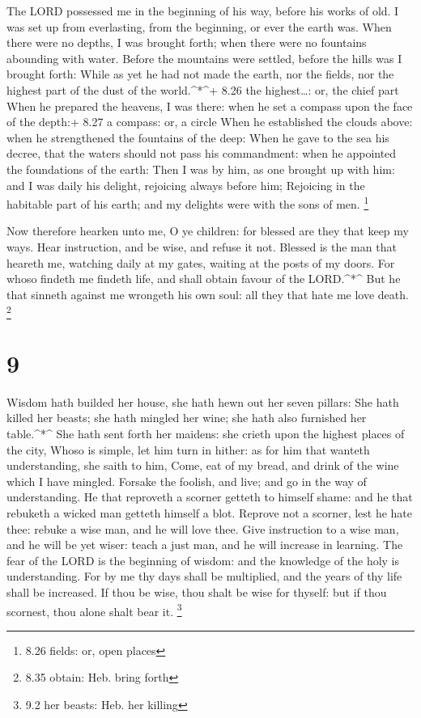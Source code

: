  The LORD possessed me in the beginning of his way, before
his works of old.  I was set up from everlasting, from the
beginning, or ever the earth was.  When there were no
depths, I was brought forth; when there were no fountains abounding with
water.  Before the mountains were settled, before the hills
was I brought forth:  While as yet he had not made the
earth, nor the fields, nor the highest part of the dust of the
world.\^{}*\^{}+ 8.26 the highest\ldots: or, the chief part
 When he prepared the heavens, I was there: when he set a
compass upon the face of the depth:+ 8.27 a compass: or, a circle
 When he established the clouds above: when he strengthened
the fountains of the deep:  When he gave to the sea his
decree, that the waters should not pass his commandment: when he
appointed the foundations of the earth:  Then I was by him,
as one brought up with him: and I was daily his delight, rejoicing
always before him;  Rejoicing in the habitable part of his
earth; and my delights were with the sons of men. \footnote{8.26 fields:
  or, open places}

 Now therefore hearken unto me, O ye children: for blessed
are they that keep my ways.  Hear instruction, and be wise,
and refuse it not.  Blessed is the man that heareth me,
watching daily at my gates, waiting at the posts of my doors.
 For whoso findeth me findeth life, and shall obtain favour
of the LORD.\^{}*\^{}  But he that sinneth against me
wrongeth his own soul: all they that hate me love death. \footnote{8.35
  obtain: Heb. bring forth}

\hypertarget{section-8}{%
\section{9}\label{section-8}}

 Wisdom hath builded her house, she hath hewn out her seven
pillars:  She hath killed her beasts; she hath mingled her
wine; she hath also furnished her table.\^{}*\^{}  She hath
sent forth her maidens: she crieth upon the highest places of the city,
 Whoso is simple, let him turn in hither: as for him that
wanteth understanding, she saith to him,  Come, eat of my
bread, and drink of the wine which I have mingled.  Forsake
the foolish, and live; and go in the way of understanding. 
He that reproveth a scorner getteth to himself shame: and he that
rebuketh a wicked man getteth himself a blot.  Reprove not a
scorner, lest he hate thee: rebuke a wise man, and he will love thee.
 Give instruction to a wise man, and he will be yet wiser:
teach a just man, and he will increase in learning.  The
fear of the LORD is the beginning of wisdom: and the knowledge of the
holy is understanding.  For by me thy days shall be
multiplied, and the years of thy life shall be increased. 
If thou be wise, thou shalt be wise for thyself: but if thou scornest,
thou alone shalt bear it. \footnote{9.2 her beasts: Heb. her killing}

